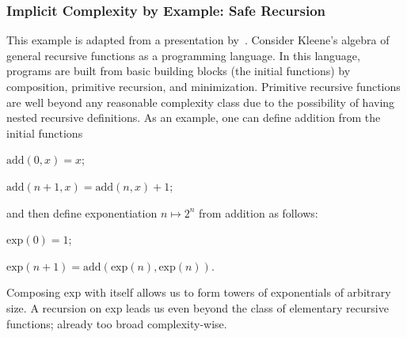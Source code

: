 \subsubsection{Implicit Complexity by Example: Safe Recursion}
\label{safe-rec}

This example is adapted from a presentation by~\textcite{dallago2022}.
Consider Kleene's algebra of general recursive functions as a programming language.
In this language, programs are built from basic building blocks (the initial functions) by %
composition, primitive recursion, and minimization.
Primitive recursive functions are
well beyond any reasonable complexity class
due to the possibility of having nested recursive definitions.
As an example, one can define addition from the initial functions

\begin{center}
\(\text{add}(0, x) = x\);

\(\text{add}(n + 1, x) = \text{add}(n, x) + 1\);
\end{center}

and then define exponentiation \(n \mapsto 2^n\) from addition as follows:

\begin{center}
\(\text{exp}(0) = 1\);

\(\text{exp}(n + 1) = \text{add}(\text{exp}(n), \text{exp}(n))\).
\end{center}

\noindent Composing exp with itself allows us to form towers of exponentials of arbitrary size. %
A recursion on exp leads us even beyond the class of elementary recursive functions; %
already too broad complexity-wise.

